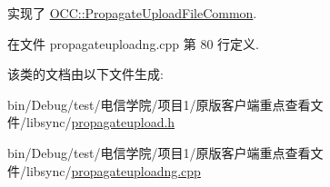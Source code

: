 实现了 \hyperlink{class_o_c_c_1_1_propagate_upload_file_common_a7df70722c1bc35b534d7cd1829abe8f5}{O\+C\+C\+::\+Propagate\+Upload\+File\+Common}.



在文件 propagateuploadng.\+cpp 第 80 行定义.



该类的文档由以下文件生成\+:\begin{DoxyCompactItemize}
\item 
bin/\+Debug/test/电信学院/项目1/原版客户端重点查看文件/libsync/\hyperlink{propagateupload_8h}{propagateupload.\+h}\item 
bin/\+Debug/test/电信学院/项目1/原版客户端重点查看文件/libsync/\hyperlink{propagateuploadng_8cpp}{propagateuploadng.\+cpp}\end{DoxyCompactItemize}
